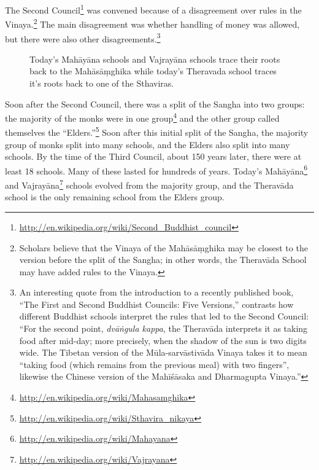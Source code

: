 The Second Council\footnote{\url{http://en.wikipedia.org/wiki/Second_Buddhist_council}} was convened because of a disagreement over rules in the Vinaya.\footnote{Scholars believe that the Vinaya of the Mahāsāṃghika may be closest to the version before the split of the Sangha; in other words, the Theravāda School may have added rules to the Vinaya.} The main disagreement was whether handling of money was allowed, but there were also other disagreements.\footnote{An interesting quote from the introduction to a recently published book, “The First and Second Buddhist Councils: Five Versions,” contrasts how different Buddhist schools interpret the rules that led to the Second Council: “For the second point, \textit{dvāṅgula kappa}, the Theravāda interprets it as taking food after mid-day; more precisely, when the shadow of the sun is two digits wide. The Tibetan version of the Mūla-sarvāstivāda Vinaya takes it to mean “taking food (which remains from the previous meal) with two fingers”, likewise the Chinese version of the Mahīśāsaka and Dharmagupta Vinaya.”}

\pagebreak

\begin{figure}[h]
\centering

\caption{Today’s Mahāyāna schools and Vajrayāna schools trace their roots back to the Mahāsāṃghika while today’s Theravada school traces it’s roots back to one of the Sthaviras.}
\label{fig:Schools}
\end{figure}

Soon after the Second Council, there was a split of the Sangha into two groups: the majority of the monks were in one group\footnote{\url{http://en.wikipedia.org/wiki/Mahasamghika}} and the other group called themselves the “Elders.”\footnote{\url{http://en.wikipedia.org/wiki/Sthavira_nikaya}} Soon after this initial split of the Sangha, the majority group of monks split into many schools, and the Elders also split into many schools. By the time of the Third Council, about 150 years later, there were at least 18 schools. Many of these lasted for hundreds of years. Today’s Mahāyāna\footnote{\url{http://en.wikipedia.org/wiki/Mahayana}} and Vajrayāna\footnote{\url{http://en.wikipedia.org/wiki/Vajrayana}} schools evolved from the majority group, and the Theravāda school is the only remaining school from the Elders group.

